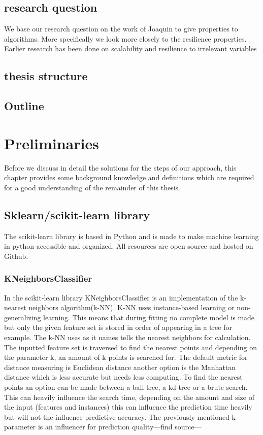\documentclass[a4paper,10pt]{article}
\begin{document}
\subsection{research question}
We base our research question on the work of Joaquin to give properties to algorithms\cite{Joaquin-phd}. More specifically we look more closely to the resilience properties. 
Earlier research has been done on scalability and resilience to irrelevant variables\cite{Resil-1}

\subsection{thesis structure}

\subsection{Outline}

\newpage


\section{Preliminaries} \label{Chapter2}
Before we discuss in detail the solutions for the steps of our approach, this chapter provides
some background knowledge and definitions which are required for a good understanding of
the remainder of this thesis.
\subsection{Sklearn/scikit-learn library}
The scikit-learn library is based in Python and is made to make machine learning in python accessible and organized. 
All resources are open source and hosted on Github. 

\subsubsection{KNeighborsClassifier}
In the scikit-learn library KNeighborsClassifier is an implementation of the k-nearest neighbors algorithm(k-NN). K-NN uses instance-based learning or non-generalizing learning. This means that during fitting no complete model is made but only the given feature set is stored in order of appearing in a tree for example. The k-NN uses as it names tells the nearest neighbors for calculation. The inputted feature set is traversed to find the nearest points and depending on the parameter k, an amount of k points is searched for. The default metric for distance measuring is Euclidean distance another option is the Manhattan distance which is less accurate but needs less computing. To find the nearest points an option can be made between a ball tree, a kd-tree or a brute search. This can heavily influence the search time, depending on the amount and size of the input (features and instances) this can influence the prediction time heavily but will not the influence predictive accuracy. The previously mentioned k parameter is an influencer for prediction quality—find source---
\end{document}
